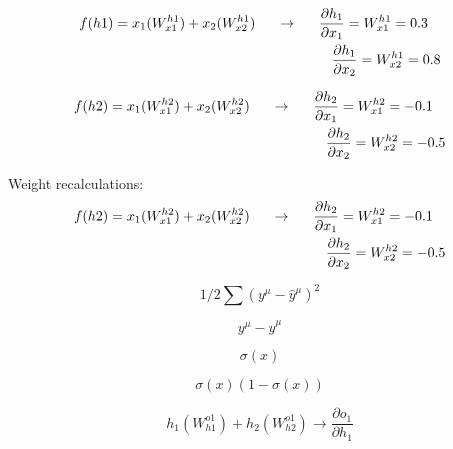\documentclass[]{article}
\begin{document}
\begin{equation} \label{eq1}
\begin{split}
f(h1) & = x_1(W_{x1}^{h1}) + x_2(W_{x2}^{h1}) \text{\phantom{aaa}} \rightarrow \text{\phantom{aaa}} \displaystyle\frac{\partial h_1}{\partial x_1} = W_{x1}^{h1} = 0.3 \\
& \text{\phantom{||||aaaaaaaaaaaaaaaaaaaaaaaaaaaaa}} \displaystyle\frac{\partial h_1}{\partial x_2} = W_{x2}^{h1} = 0.8
\end{split}
\end{equation}

\begin{equation} \label{eq1}
\begin{split}
f(h2) & = x_1(W_{x1}^{h2}) + x_2(W_{x2}^{h2}) \text{\phantom{aaa}} \rightarrow \text{\phantom{aaa}} \displaystyle\frac{\partial h_2}{\partial x_1} = W_{x1}^{h2} = -0.1 \\
& \text{\phantom{||||aaaaaaaaaaaaaaaaaaaaaaaaaaaaa}} \displaystyle\frac{\partial h_2}{\partial x_2} = W_{x2}^{h2} = -0.5
\end{split}
\end{equation}

Weight recalculations:
\begin{equation} \label{eq1}
\begin{split}
f(h2) & = x_1(W_{x1}^{h2}) + x_2(W_{x2}^{h2}) \text{\phantom{aaa}} \rightarrow \text{\phantom{aaa}} \displaystyle\frac{\partial h_2}{\partial x_1} = W_{x1}^{h2} = -0.1 \\
& \text{\phantom{||||aaaaaaaaaaaaaaaaaaaaaaaaaaaaa}} \displaystyle\frac{\partial h_2}{\partial x_2} = W_{x2}^{h2} = -0.5
\end{split}
\end{equation}


\[ 1/2 \sum(y^\mu - \hat{y}^\mu)^2 \]

\[ y^\mu - \hat{y}^\mu \]

\[ \sigma(x) \]

\[ \sigma(x)(1 - \sigma(x)) \]

\[ h_1(W_{h1}^{o1}) + h_2(W_{h2}^{o1}) \rightarrow  \displaystyle\frac{\partial o_1}{\partial h_1}\]
\end{document}
